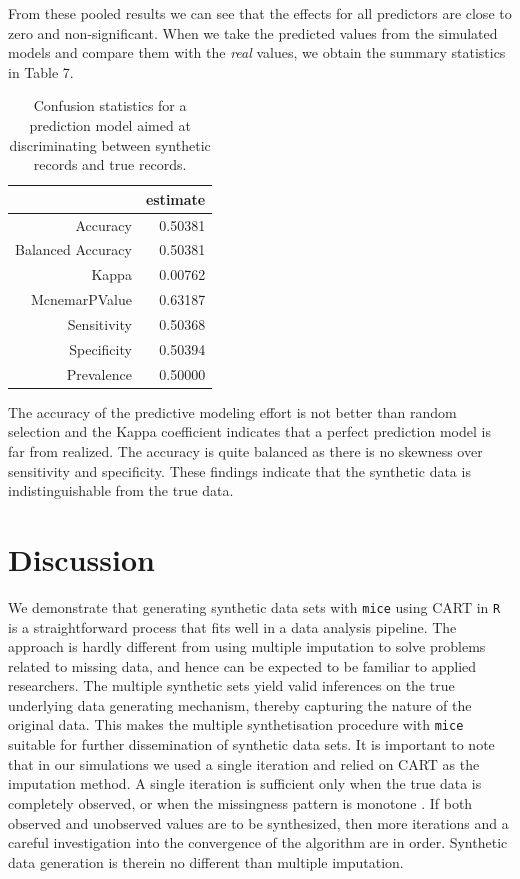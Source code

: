 \documentclass[psych,article,submit,moreauthors,pdftex]{mdpi}
\begin{document}
From these pooled results we can see that the effects for all predictors
are close to zero and non-significant. When we take the predicted values
from the simulated models and compare them with the \emph{real} values,
we obtain the summary statistics in Table 7.

\begin{table}[H]
\caption{Confusion statistics for a prediction model aimed at discriminating between synthetic records and true records.}
\centering
\begin{tabular}{rr}
  \hline
& estimate\\
  \hline
 Accuracy & 0.50381 \\
 Balanced Accuracy & 0.50381 \\
 Kappa & 0.00762 \\
 McnemarPValue & 0.63187 \\
 Sensitivity & 0.50368 \\
 Specificity & 0.50394 \\
 Prevalence & 0.50000 \\
   \hline
\end{tabular}
\end{table}

The accuracy of the predictive modeling effort is not better than random
selection and the Kappa coefficient indicates that a perfect prediction
model is far from realized. The accuracy is quite balanced as there is
no skewness over sensitivity and specificity. These findings indicate
that the synthetic data is indistinguishable from the true data.

\hypertarget{discussion}{%
\section{Discussion}\label{discussion}}

We demonstrate that generating synthetic data sets with \texttt{mice}
using CART in \texttt{R} is a straightforward process that fits well in
a data analysis pipeline. The approach is hardly different from using
multiple imputation to solve problems related to missing data, and hence
can be expected to be familiar to applied researchers. The multiple
synthetic sets yield valid inferences on the true underlying data
generating mechanism, thereby capturing the nature of the original data.
This makes the multiple synthetisation procedure with \texttt{mice}
suitable for further dissemination of synthetic data sets. It is
important to note that in our simulations we used a single iteration and
relied on CART as the imputation method. A single iteration is
sufficient only when the true data is completely observed, or when the
missingness pattern is monotone \citep{drechsler_synthetic_2011}. If
both observed and unobserved values are to be synthesized, then more
iterations and a careful investigation into the convergence of the
algorithm are in order. Synthetic data generation is therein no
different than multiple imputation.
\end{document}
